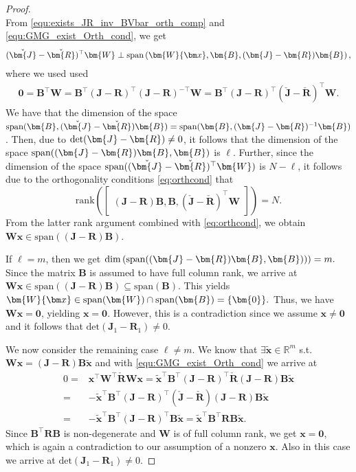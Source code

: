 \documentclass{article}
\newcommand{\bmW}{\bm{W}}
\newcommand{\bmJ}{\bm{J}}
\newcommand{\bmR}{\bm{R}}
\newcommand{\bmB}{\bm{B}}
\newcommand{\R}{\mathbb{R}}
\newcommand{\statex}{{\bm x}}
\newcommand{\stateapprox}{\tilde{\bm x}}
\newcommand{\bzero}{\mathbf{0}}
\newcommand{\portsize}{m}
\newcommand{\FOMsize}{N}
\newcommand{\Jcheck}{\check{\bmJ}}
\newcommand{\Rcheck}{\check{\bmR}}
\begin{document}
\begin{proof}
\begin{equation}
			\end{equation}
			From \eqref{equ:exists_JR_inv_BVbar_orth_comp} and \eqref{equ:GMG_exist_Orth_cond}, we get 
			\begin{align} \label{eq:orthcond}(\Jcheck-\Rcheck)^{\top}\bmW\perp \textnormal{span}\left( \bmW\statex, \bmB, (\bmJ-\bmR) \bmB\right), \end{align}
			where we used used
			\begin{align*}
				\bm{0} = \bmB^\top\bmW = \bmB^\top (\bmJ-\bmR)^\top (\bmJ-\bmR)^{-\top}  \bmW = \bmB^\top (\bmJ-\bmR)^\top (\Jcheck-\Rcheck)^{\top}  \bmW.
			\end{align*}
			We have that the dimension of the space $\textnormal{span}(\bmB,(\Jcheck-\Rcheck)\bmB) = \textnormal{span}(\bmB,(\bmJ-\bmR)^{-1}\bmB)$. Then, due to $\textnormal{det}(\bmJ-\bmR)\neq 0$, it follows that the dimension of the space $\textnormal{span}((\bmJ-\bmR)\bmB, \bmB)$ is $\ell$. Further, since the dimension of the space $\textnormal{span} ((\Jcheck-\Rcheck)^{\top}\bmW)$ is $\FOMsize-\ell$, it follows due to the orthogonality conditions \eqref{eq:orthcond} that 				
			$$
				\mathrm{rank}\left(
				\begin{bmatrix}
					(\bmJ-\bmR)\bmB, \bmB, (\Jcheck-\Rcheck)^{\top}\bmW
				\end{bmatrix}
				\right) =\FOMsize.$$
				From the latter rank argument combined with \eqref{eq:orthcond}, we obtain $\bmW\statex\in\mathrm{span}\left((\bmJ-\bmR)\bmB\right)$. 
			
			If $\ell=\portsize$, then
			  we get $
			\mathrm{dim}\left(\textnormal{span}
				((\bmJ-\bmR)\bmB, \bmB))\right)
			=\portsize.
			$ 
			Since the matrix $\bmB$ is assumed to have full column rank, we arrive at $\bmW\statex\in \mathrm{span}
			\left((\bmJ-\bmR)\bmB\right)\subseteq
			\mathrm{span}(\bmB).
			$
			This yields $\bmW\statex\in \textnormal{span}(\bmW)\cap \textnormal{span}( \bmB)= \{ \bm{0} \}.$
			Thus, we have $\bmW\statex=\bm{0}$, yielding $\statex=\bm{0}$. However, this is a contradiction since we assume $\statex\neq\bm{0}$ and it follows that $\mathrm{det}(\bmJ_1-\bmR_1)\neq0. $
			
		    We now consider the remaining case $\ell\neq\portsize$.
		    We know that  $\exists\stateapprox\in\R^{\portsize}$ s.t. $\bmW\statex=(\bmJ-\bmR)\bmB\stateapprox$ and with \eqref{equ:GMG_exist_Orth_cond} we arrive at
			\begin{align*}
				0 =&\statex^{\top}\bmW^{\top}\Rcheck\bmW\statex
				=\stateapprox^{\top}\bmB^{\top}(\bmJ-\bmR)^{\top}
				\Rcheck
				(\bmJ-\bmR)\bmB\stateapprox\\
				=&
				-\stateapprox^{\top}\bmB^{\top}(\bmJ-\bmR)^{\top}
				(\Jcheck-\Rcheck)
				(\bmJ-\bmR)\bmB\stateapprox\\
				=&
				-\stateapprox^{\top}\bmB^{\top}(\bmJ-\bmR)^{\top}
				\bmB\stateapprox
				=
				\stateapprox^{\top}\bmB^{\top}\bmR
				\bmB\stateapprox.
			\end{align*}
			Since $\bmB^{\top}\bmR\bmB$ is non-degenerate and $\bmW$ is of full column rank, we get $\statex= \bzero$, which is again a contradiction to our assumption of a nonzero $\statex$. Also in this case we arrive at $\mathrm{det}(\bmJ_1-\bmR_1)\neq0.$
			

\end{proof}
\end{document}
